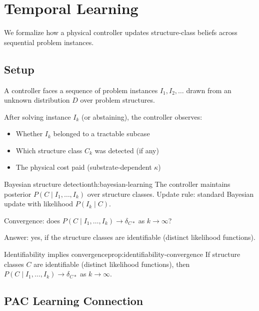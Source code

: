 \section{Temporal Learning}\label{sec:temporal-learning}

We formalize how a physical controller updates structure-class beliefs across sequential problem instances.

\subsection{Setup}

A controller faces a sequence of problem instances $I_1, I_2, \ldots$ drawn from an unknown distribution $D$ over problem structures.

After solving instance $I_k$ (or abstaining), the controller observes:
\begin{itemize}
\item Whether $I_k$ belonged to a tractable subcase
\item Which structure class $C_k$ was detected (if any)
\item The physical cost paid (substrate-dependent $\kappa$)
\end{itemize}

\begin{claim}{Bayesian structure detection}{th:bayesian-learning}
The controller maintains posterior $P(C \mid I_1, \ldots, I_k)$ over structure classes. Update rule: standard Bayesian update with likelihood $P(I_k \mid C)$.
\end{claim}


Convergence: does $P(C \mid I_1, \ldots, I_k) \to \delta_{C*}$ as $k \to \infty$?

Answer: yes, if the structure classes are identifiable (distinct likelihood functions).

\begin{claim}{Identifiability implies convergence}{prop:identifiability-convergence}
If structure classes $C$ are identifiable (distinct likelihood functions), then $P(C \mid I_1, \ldots, I_k) \to \delta_{C*}$ as $k \to \infty$.
\end{claim}


\subsection{PAC Learning Connection}

